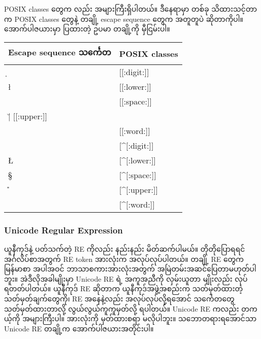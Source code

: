 \documentclass[11pt]{article}
\begin{document}
    POSIX classes တွေက လည်း အများကြီးရှိပါတယ်။ ဒီနေရာမှာ တစ်ခု သိထားသင့်တာက
POSIX classes တွေနဲ့ တချို့ escape sequence တွေက အတူတူပဲ ဆိုတာကိုပါ။
အောက်ပါဇယားမှာ ပြထားတဲ့ ဥပမာ တချို့ကို မှီငြမ်းပါ။

    \begin{longtable}[c]{@{}ll@{}}
\toprule
Escape sequence သင်္ကေတ & POSIX classes\tabularnewline
\midrule
\endhead
\d  & {[}{[}:digit:{]}{]}\tabularnewline
\l  & {[}{[}:lower:{]}{]}\tabularnewline
\s  & {[}{[}:space:{]}{]}\tabularnewline
\u | {[}{[}:upper:{]}{]}\tabularnewline
\w  & {[}{[}:word:{]}{]}\tabularnewline
\D  & {[}\^{}{[}:digit:{]}{]}\tabularnewline
\L  & {[}\^{}{[}:lower:{]}{]}\tabularnewline
\S  & {[}\^{}{[}:space:{]}{]}\tabularnewline
\U  & {[}\^{}{[}:upper:{]}{]}\tabularnewline
\W  & {[}\^{}{[}:word:{]}{]}\tabularnewline
\bottomrule
\end{longtable}

    \subsubsection{Unicode Regular
Expression}\label{unicode-regular-expression}

ယူနီကုဒ်နဲ့ ပတ်သက်တဲ့ RE ကိုလည်း နည်းနည်း မိတ်ဆက်ပါမယ်။ တိုတိုပြောရရင်
အင်္ဂလိပ်စာအတွက် RE token အားလုံးက အလုပ်လုပ်ပါတယ်။ တချို့ RE တွေက
မြန်မာစာ အပါအဝင် ဘာသာစကားအားလုံးအတွက် အမြဲတမ်းအဆင်ပြေတာမဟုတ်ပါဘူး။
အဲဒီလိုအခါမျိုးမှာ Unicode RE ရဲ့ အကူအညီကို လှမ်းယူတာ မျိုးလည်း
လုပ်ရတတ်ပါတယ်။ ယူနီကုဒ် RE ဆိုတာက ယူနီကုဒ်အဖွဲ့အစည်းက သတ်မှတ်ထားတဲ့
သတ်မှတ်ချက်တွေကို၊ RE အနေနဲ့လည်း အလုပ်လုပ်လို့ရအောင် သင်္ကေတတွေ
သတ်မှတ်ထားတာလို့ လွယ်လွယ်ကူကူမှတ်လို့ ရပါတယ်။ Unicode RE ကလည်း တကယ့်ကို
အများကြီးပါ။ အားလုံးကို မှတ်ထားစရာ မလိုပါဘူး။ သဘောတရားရအောင်သာ Unicode
RE တချို့က အောက်ပါဇယားအတိုင်းပါ။
\end{document}
